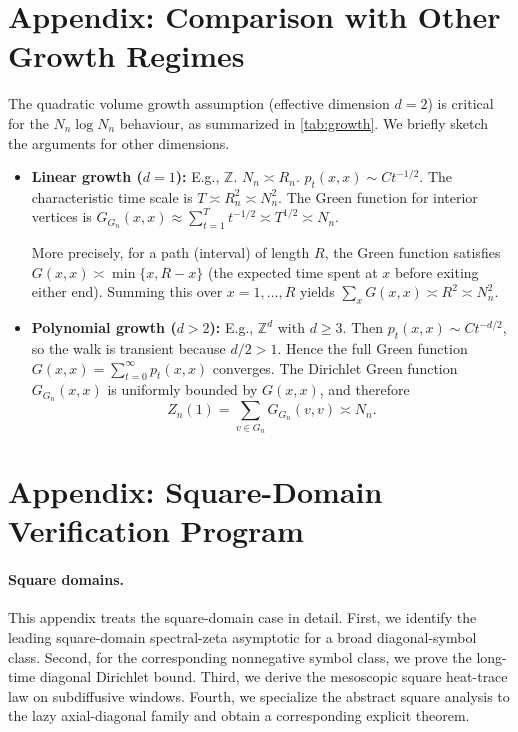 \documentclass[reqno]{amsart}
\numberwithin{equation}{section}
\theoremstyle{definition}
\theoremstyle{remark}
\newcommand{\Cref}[1]{\autoref{#1}}
\begin{document}
\appendix

\section{Appendix: Comparison with Other Growth Regimes}\label{app:growth}
The quadratic volume growth assumption (effective dimension $d=2$) is critical for the $N_n \log N_n$ behaviour, as summarized in \Cref{tab:growth}. We briefly sketch the arguments for other dimensions.

\begin{itemize}
\item \textbf{Linear growth ($d=1$):} E.g., $\mathbb{Z}$. $N_n \asymp R_n$. $p_t(x,x) \sim C t^{-1/2}$. The characteristic time scale is $T \asymp R_n^2 \asymp N_n^2$. The Green function for interior vertices is $G_{G_n}(x,x) \approx \sum_{t=1}^{T} t^{-1/2} \asymp T^{1/2} \asymp N_n$.

More precisely, for a path (interval) of length $R$, the Green function satisfies $G(x,x) \asymp \min\{x, R-x\}$ (the expected time spent at $x$ before exiting either end). Summing this over $x=1,\dots,R$ yields $\sum_x G(x,x) \asymp R^2 \asymp N_n^2$.


\item \textbf{Polynomial growth ($d>2$):} E.g., $\mathbb{Z}^d$ with $d\geq 3$. Then $p_t(x,x) \sim C t^{-d/2}$, so the walk is transient because $d/2 > 1$. Hence the full Green function $G(x,x) = \sum_{t=0}^{\infty} p_t(x,x)$ converges. The Dirichlet Green function $G_{G_n}(x,x)$ is uniformly bounded by $G(x,x)$, and therefore
\[
Z_n(1) = \sum_{v \in G_n} G_{G_n}(v,v) \asymp N_n.
\]
\end{itemize}


\section{Appendix: Square-Domain Verification Program}
\label{app:alt_pi}

\paragraph{Square domains.}
This appendix treats the square-domain case in detail. First, we identify the leading square-domain spectral-zeta asymptotic for a broad diagonal-symbol class. Second, for the corresponding nonnegative symbol class, we prove the long-time diagonal Dirichlet bound. Third, we derive the mesoscopic square heat-trace law on subdiffusive windows. Fourth, we specialize the abstract square analysis to the lazy axial-diagonal family and obtain a corresponding explicit theorem.
\end{document}
